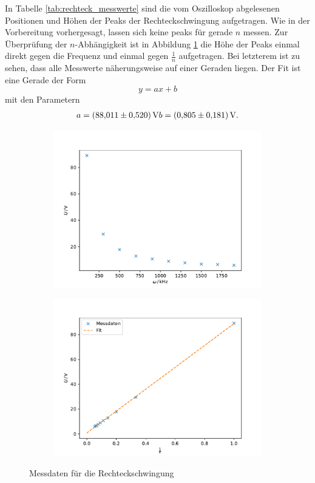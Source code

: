 In Tabelle \ref{tab:rechteck_messwerte} sind die vom Oszilloskop abgelesenen Positionen und Höhen der Peaks der Rechteckschwingung aufgetragen. Wie in der Vorbereitung vorhergesagt, lassen sich keine peaks für gerade $n$ messen.
Zur Überprüfung der $n$-Abhängigkeit ist in Abbildung \ref{fig:rechteck_fit} die Höhe der Peaks einmal direkt gegen die Frequenz und einmal gegen $\frac{1}{n}$ aufgetragen. Bei letzterem ist zu sehen, dass alle Messwerte näherungsweise auf einer Geraden liegen. Der Fit ist eine Gerade der Form
\begin{equation*}
    y = ax + b
\end{equation*}
mit den Parametern
\begin{align*}
    a = \SI{88.011 \pm 0.520}{V}
    b = \SI{0.805 \pm 0.181}{V} .
\end{align*}
\begin{figure}[h]
    \begin{subfigure}{0.5\textwidth}
        \centering
        \includegraphics[width=\textwidth]{assets/rechteck_messung.pdf}
    \end{subfigure}
    \begin{subfigure}{0.5\textwidth}
        \centering
        \includegraphics[width=\textwidth]{assets/rechteck_fit.pdf}
    \end{subfigure}
    \caption{Messdaten für die Rechteckschwingung}
    \label{fig:rechteck_fit}
\end{figure}

